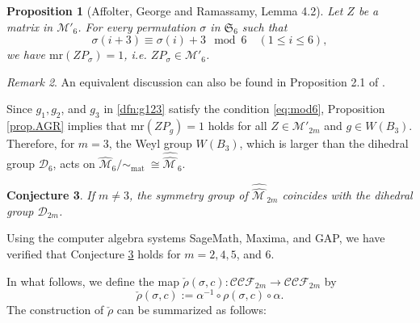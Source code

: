 \documentclass[11pt]{amsart}
\theoremstyle{plain}
\newtheorem{proposition}{Proposition}
\newtheorem{conjecture}[proposition]{Conjecture}
\theoremstyle{definition}
\theoremstyle{remark}
\newtheorem{remark}[proposition]{Remark}
\begin{document}
\begin{proposition}[Affolter, George and Ramassamy\protect\cite{AGR2025}, Lemma
4.2] \label{prop.mr}\label{prop.AGR}
    Let $Z$ be a matrix in $\mathcal{M}'_{6}$. For every permutation
    $\sigma$ in $\mathfrak{S}_6$ such that
    \begin{equation}
        \sigma(i+3) \equiv \sigma(i)+3 \mod 6 \quad (1\leq i \leq 6), \label{eq:mod6}
    \end{equation}
    we have $\mathrm{mr}(ZP_{\sigma})=1$, i.e. $ZP_\sigma\in\mathcal{M}'_{6}$.
\end{proposition}

\begin{remark}
An equivalent discussion can also be found in Proposition 2.1 of \cite{BobenkoHoffmann2001}.
\end{remark}

Since $g_1, g_2$, and $g_3$ in \eqref{dfn:g123} satisfy the condition
\eqref{eq:mod6}, Proposition \ref{prop.AGR} implies that $\mathrm{mr}(ZP_g) = 1$ holds for
all $Z \in \mathcal{M}'_{2m}$ and $g \in W(B_3)$.
Therefore, for $m = 3$, the Weyl group $W(B_3)$, which is larger than the
dihedral group $\mathcal{D}_6$, acts on
$\widehat{\mathcal{M}}_{6}/\sim_{\text{mat}} \ \cong \widehat{\widehat{\mathcal{M}\,}}_{6}$.


\begin{conjecture} \label{conj.dihedral}
If $m \ne 3$, the symmetry group of $\widehat{\widehat{\mathcal{M}\,}}_{2m}$ coincides with the dihedral
group $\mathcal{D}_{2m}$.
\end{conjecture}
Using the computer algebra systems SageMath, Maxima, and GAP, we have verified
that Conjecture \ref{conj.dihedral} holds for $m=2, 4, 5$, and $6$.

In what follows, we define the map $\check{\rho}(\sigma,c): \mathcal{CCF}_{2m}\to\mathcal{CCF}_{2m}$ by
\begin{equation}
    \check{\rho}(\sigma,c):=\alpha^{-1}\circ \rho(\sigma,c)\circ \alpha.
\end{equation}
The construction of $\check{\rho}$ can be summarized as follows:

\begin{center}
\end{center}
\end{document}
